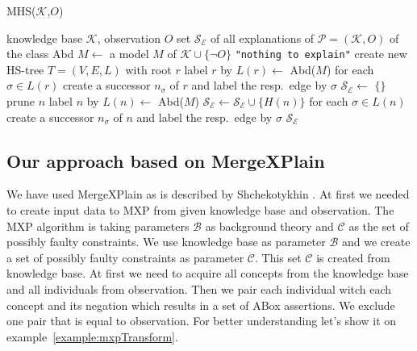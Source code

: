 \documentclass[12pt,a4paper]{article}
\begin{document}
\begin{algorithm}[H] 
	\footnotesize
	\caption{MHS($\mathcal{K}$,$O$)}
	\label{alg:mhs}
	\begin{algorithmic}[1]
		\Require knowledge base $\mathcal{K}$, observation $O$
		\Ensure set $\mathcal{S}_{\mathcal{E}}$ of all explanations of $\mathcal{P}=(\mathcal{K},O)$ of the class Abd
		\State $M \gets$ a model $M$ of $\mathcal{K} \cup \{\neg O\}$
		\label{soal:ta_init}
		\State \Return \texttt{"nothing to explain"} %
		\label{soal:nte}
		\EndIf %
		\label{soal:init:e}
		\State create new HS-tree $T=(V,E,L)$ with root $r$ %
		\label{soal:root:b}
		\State label $r$ by $L(r) \gets$ Abd($M$)
		\label{soal:r-label}
		\State for each $\sigma\in L(r)$ create a successor $n_\sigma$ of $r$
		and label the resp.\ edge by $\sigma$ %
		\label{soal:root:e}
		\State $\mathcal{S}_{\mathcal{E}} \gets$ $\{\}$ %
		\label{soal:SE:init}
		\label{soal:loop:b}
		\label{soal:prune:b}
		\State prune $n$
		\label{soal:prune:e}
		\label{soal:ta}
		\State label $n$ by $L(n) \gets$  Abd($M$) 
		\Else %
		\State $\mathcal{S}_\mathcal{E} \gets \mathcal{S}_\mathcal{E} \cup \{H(n)\}$ 
		\EndIf
		\State for each $\sigma\in L(n)$ create a successor $n_\sigma$ of $n$
		and label the resp.\ edge by $\sigma$ %
		\label{soal:modproc:e}
		\EndWhile
		\label{soal:loop:e}
		\label{soal:output}
		\State \Return $\mathcal{S}_\mathcal{E}$
	\end{algorithmic}
\end{algorithm}

\subsection{Our approach based on MergeXPlain}
We have used MergeXPlain as is described by Shchekotykhin \citep{MXP}. At first we needed to create input data to MXP from given knowledge base and observation. The MXP algorithm is taking parameters $\mathcal{B}$ as background theory and $\mathcal{C}$ as the set of possibly faulty constraints. We use knowledge base as parameter $\mathcal{B}$ and we create a set of possibly faulty constraints as parameter $\mathcal{C}$. This set $\mathcal{C}$ is created from knowledge base. At first we need to acquire all concepts from the knowledge base and all individuals from observation. Then we pair each individual witch each concept and its negation which results in a set of ABox assertions. We exclude one pair that is equal to observation. For better understanding let's show it on example~\ref{example:mxpTransform}.
\end{document}
